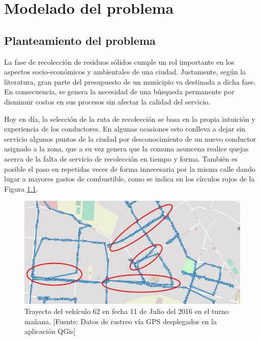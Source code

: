 \chapter{Modelado del problema}
\label{chap5}
\ifpdf
  \graphicspath{{Chapter5/Chapter5Figs/PNG/}{Chapter5/Chapter5Figs/PDF/}{Chapter5/Chapter5Figs/}}
\else
  \graphicspath{{Chapter5/Chapter5Figs/EPS/}{Chapter5/Chapter5Figs/}}
\fi


\section{Planteamiento del problema}

La fase de recolección de residuos sólidos cumple un rol importante en los aspectos socio-económicos y ambientales de una ciudad. Justamente, según la literatura, gran parte del presupuesto de un municipio va destinada a dicha fase. En consecuencia, se genera la necesidad de una búsqueda permanente por disminuir costos en sus procesos sin afectar la calidad del servicio. 

Hoy en día, la selección de la ruta de recolección se basa en la propia intuición y experiencia de los conductores. En algunas ocasiones esto conlleva a dejar sin servicio algunos puntos de la ciudad por desconocimiento de un nuevo conductor asignado a la zona, que a su vez genera que la comuna asuncena realice quejas acerca de la falta de servicio de recolección en tiempo y forma. También es posible el paso en repetidas veces de forma innecesaria por la misma calle dando lugar a mayores gastos de combustible, como se indica en los círculos rojos de la Figura \ref{fig:trayectoRecoleccion}.

\begin{figure}[tb]
    \centering
    \includegraphics[width=14.5cm]{20170329_recorrido_repetido.png}
    \caption{Trayecto del vehículo 62 en fecha 11 de Julio del 2016 en el turno mañana. [Fuente: Datos de rastreo vía GPS desplegados en la aplicación QGis]}
    \label{fig:trayectoRecoleccion}
\end{figure}

